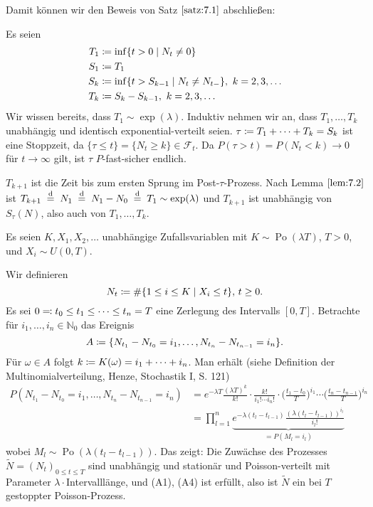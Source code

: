 \documentclass[a4paper,twoside,DIV15,BCOR12mm]{scrbook}
\newcommand{\cF}{\mathcal F}
\begin{document}
Damit können wir den Beweis von Satz $\ref{satz:7.1}$ abschließen:

Es seien
\begin{align*}
T_1 &\da \inf\{t>0\mid N_t\ne 0\} \\
S_1 &\da T_1 \\
S_k &\da \inf\{t>S_{k-1} \mid N_t \ne N_{t-}\},\ k=2,3,\ldots\\
T_k &\da S_k - S_{k-1},\ k=2,3,\dots
\end{align*}
Wir wissen bereits, dass $T_1 \sim \exp(\lambda)$. Induktiv nehmen wir an, dass $T_1,\ldots,T_k$ unabhängig und identisch exponential-verteilt seien. $\tau \da T_1 + \cdots + T_k = S_k$ ist eine Stoppzeit, da $\{\tau \le t\} = \{N_t \ge k\} \in \cF_t$. Da $P(\tau > t)= P(N_t < k) \to 0$ für $t\to\infty$ gilt, ist $\tau$ $P$-fast-sicher endlich.

$T_{k+1}$ ist die Zeit bis zum ersten Sprung im Post-$\tau$-Prozess. Nach Lemma $\ref{lem:7.2}$ ist $T_{k+1}\gleichnach{d} N_1\gleichnach{d} N_1-N_0\gleichnach{d} T_1\sim \exp(\lambda)$ und $T_{k+1}$ ist unabhängig von $S_\tau(N)$, also auch von $T_1,\ldots,T_k$.

\begin{beispiel}
Es seien $K,X_1,X_2,\ldots$ unabhängige Zufallsvariablen mit $K\sim \operatorname{Po}(\lambda T)$, $T>0$, und $X_i\sim U(0,T)$.

Wir definieren\[
N_t \da \#\{1\le i \le K\mid X_i\le t\},\, t\ge 0.
\]
Es sei $0\ad t_0\le t_1 \le \cdots\le t_n=T$ eine Zerlegung des Intervalls $[0,T]$. Betrachte für $i_1,\ldots,i_n\in \mathbb N_0$ das Ereignis
\[
A \da \{N_{t_1} - N_{t_0} = i_1,\ldots,N_{t_n}-N_{t_{n-1}} = i_n\}.
\]
Für $\omega \in A$ folgt $k \da K(\omega) = i_1+\cdots+ i_n$. Man erhält (siehe Definition der Multinomialverteilung, Henze, Stochastik I, S. 121)
\begin{align*}
P(N_{t_1} - N_{t_0}=i_1,\ldots,N_{t_n} - N_{t_{n-1}} = i_n) 
&= e^{-\lambda T}\frac{(\lambda T)^k}{k!}\cdot \frac{k!}{i_1!\cdots i_n!}\cdot\Big(\frac{t_1-t_0}{T}\Big)^{i_1}\cdots \Big(\frac{t_n-t_{n-1}}{T}\Big)^{i_n} \\
&= \prod_{l=1}^n \underbrace{e^{-\lambda(t_l-t_{l-1})} \frac{(\lambda (t_l - t_{l-1}))^{i_l}}{i_l!}}_{=P(M_l=i_l)}
\end{align*}
wobei $M_l\sim \operatorname{Po}(\lambda(t_l-t_{l-1}))$. Das zeigt: Die Zuwächse des Prozesses $\tilde N=(N_t)_{0\le t\le T}$ sind unabhängig und stationär und Poisson-verteilt mit Parameter $\lambda\cdot$Intervalllänge, und (A1), (A4) ist erfüllt, also ist $\tilde N$ ein bei $T$ gestoppter Poisson-Prozess.
\end{beispiel}
\end{document}
